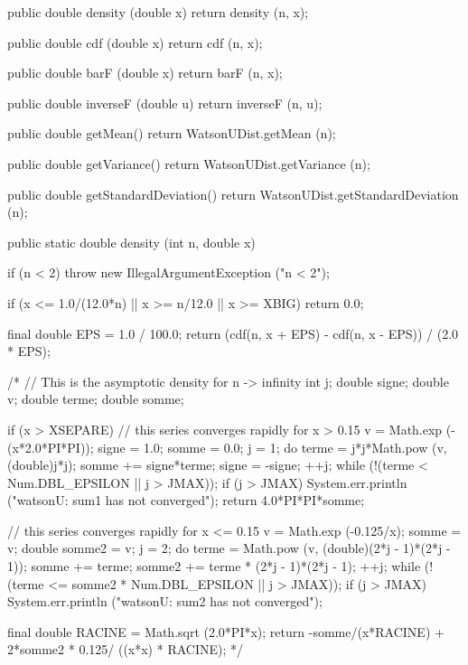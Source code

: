 \begin{code}\begin{hide}

   public double density (double x) {
      return density (n, x);
   }

   public double cdf (double x) {
      return cdf (n, x);
   }

   public double barF (double x) {
      return barF (n, x);
   }

   public double inverseF (double u) {
      return inverseF (n, u);
   }

   public double getMean() {
      return WatsonUDist.getMean (n);
   }

   public double getVariance() {
      return WatsonUDist.getVariance (n);
   }

   public double getStandardDeviation() {
      return WatsonUDist.getStandardDeviation (n);
   }\end{hide}

   public static double density (int n, double x)\begin{hide} {
      if (n < 2)
         throw new IllegalArgumentException ("n < 2");

      if (x <= 1.0/(12.0*n) || x >= n/12.0 || x >= XBIG)
         return 0.0;

      final double EPS = 1.0 / 100.0;
      return (cdf(n, x + EPS) - cdf(n, x - EPS)) / (2.0 * EPS);

/*
// This is the asymptotic density for n -> infinity
      int j;
      double signe;
      double v;
      double terme;
      double somme;

      if (x > XSEPARE) {
         // this series converges rapidly for x > 0.15
         v = Math.exp (-(x*2.0*PI*PI));
         signe = 1.0;
         somme = 0.0;
         j = 1;
         do {
            terme = j*j*Math.pow (v, (double)j*j);
            somme += signe*terme;
            signe = -signe;
            ++j;
         } while (!(terme < Num.DBL_EPSILON || j > JMAX));
         if (j > JMAX)
            System.err.println ("watsonU:  sum1 has not converged");
         return 4.0*PI*PI*somme;
      }

      // this series converges rapidly for x <= 0.15
      v = Math.exp (-0.125/x);
      somme = v;
      double somme2 = v;
      j = 2;
      do {
         terme = Math.pow (v, (double)(2*j - 1)*(2*j - 1));
         somme += terme;
         somme2 += terme * (2*j - 1)*(2*j - 1);
         ++j;
      } while (!(terme <= somme2 * Num.DBL_EPSILON || j > JMAX));
      if (j > JMAX)
         System.err.println ("watsonU:  sum2 has not converged");

      final double RACINE = Math.sqrt (2.0*PI*x);
      return -somme/(x*RACINE) + 2*somme2 * 0.125/ ((x*x) * RACINE);
*/
   }\end{hide}
\end{code}
